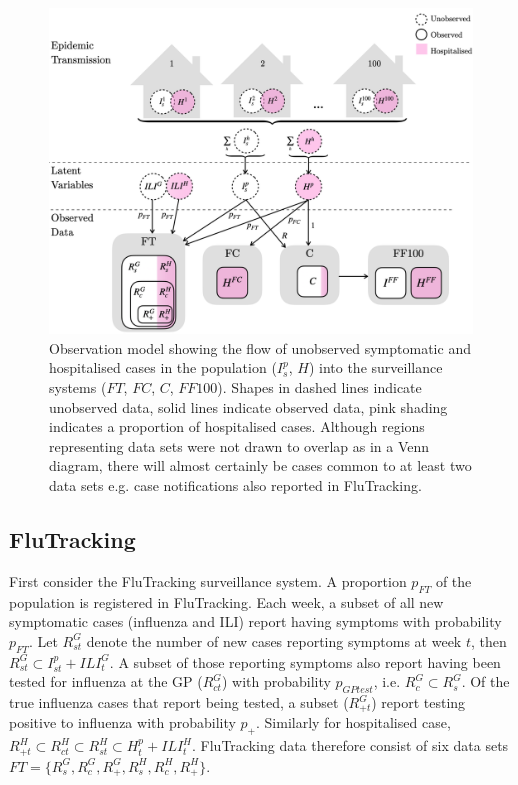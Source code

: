 \begin{figure}[h!]
	\centering
	\includegraphics[scale=0.4]{Figs/Observation_model_diagram}
	\caption{Observation model showing the flow of unobserved symptomatic and hospitalised cases in the population ($I_s^p$, $H$) into the surveillance systems ($FT$, $FC$, $C$, $FF100$). Shapes in dashed lines indicate unobserved data, solid lines indicate observed data, pink shading indicates a proportion of hospitalised cases. Although regions representing data sets were not drawn to overlap as in a Venn diagram, there will almost certainly be cases common to at least two data sets e.g. case notifications also reported in FluTracking.}
	\label{fig:Observation_model}
\end{figure}

\subsection{FluTracking}
First consider the FluTracking surveillance system. A proportion $p_{FT}$ of the population is registered in FluTracking. Each week, a subset of all new symptomatic cases (influenza and ILI) report having symptoms with probability $p_{FT}$. Let $R_{st}^G$ denote the number of new cases reporting symptoms at week $t$, then $R_{st}^G \subset I_{st}^p + ILI_t^{G}$. A subset of those reporting symptoms also report having been tested for influenza at the GP ($R_{ct}^G$) with probability $p_{GPtest}$, i.e. $R_c^G \subset R_s^G$. Of the true influenza cases that report being tested, a subset ($R_{+t}^G$) report testing positive to influenza with probability $p_{+}$. Similarly for hospitalised case, $R_{+t}^H \subset R_{ct}^H \subset R_{st}^H \subset H_t^p + ILI_t^{H}$. FluTracking data therefore consist of six data sets $FT = \{R_s^G, R_c^G, R_+^G, R_s^H, R_c^H, R_+^H\}$.

